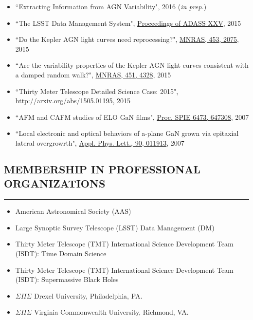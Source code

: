\documentclass[10pt,a4]{article}
\newcounter{mySaveCounter}
\newcommand\myEnumReset{\setcounter{mySaveCounter}{0}}
\begin{document}
\begin{itemize}
	\item ``Extracting Information from AGN Variability", 2016 (\textit{in prep.})
	\item ``The LSST Data Management System", \href{http://adsabs.harvard.edu/cgi-bin/bib_query?arXiv:1512.07914}{Proceedings of ADASS XXV}, 2015
	\item ``Do the Kepler AGN light curves need reprocessing?", \href{http://dx.doi.org/10.1093/mnras/stv1797}{MNRAS, 453, 2075}, 2015
	\item ``Are the variability properties of the Kepler AGN light curves consistent with a damped random walk?", \href{http://dx.doi.org/ 10.1093/mnras/stv1230}{MNRAS, 451, 4328}, 2015
	\item  ``Thirty Meter Telescope Detailed Science Case: 2015", \href{http://arxiv.org/abs/1505.01195}{http://arxiv.org/abs/1505.01195}, 2015
	\item  ``AFM and CAFM studies of ELO GaN films", \href{http://dx.doi.org/10.1117/12.706773}{Proc. SPIE 6473, 647308}, 2007
	\item ``Local electronic and optical behaviors of a-plane GaN grown via epitaxial lateral overgrowrth", \href{http://dx.doi.org/10.1063/1.2429901}{Appl. Phys. Lett., 90, 011913}, 2007
\end{itemize}

\myEnumReset 

\subsection*{MEMBERSHIP IN PROFESSIONAL ORGANIZATIONS}
\hrule  height 4pt
\vspace{0.2cm}

\begin{itemize}
	\item American Astronomical Society (AAS)
	\item Large Synoptic Survey Telescope (LSST) Data Management (DM)
	\item Thirty Meter Telescope (TMT) International Science Development Team (ISDT): Time Domain Science
	\item Thirty Meter Telescope (TMT) International Science Development Team (ISDT): Supermassive Black Holes
	\item $\Sigma \Pi \Sigma$ Drexel University, Philadelphia, PA.
	\item $\Sigma \Pi \Sigma$ Virginia Commonwealth University, Richmond, VA.
\end{itemize}
\end{document}

